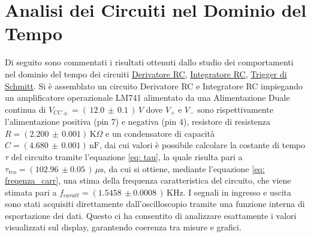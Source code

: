\documentclass[a4paper,12pt]{article}
\begin{document}
\section{Analisi dei Circuiti nel Dominio del Tempo}
\label{componenti}
Di seguito sono commentati i risultati ottenuti dallo studio dei comportamenti nel dominio del tempo dei circuiti \hyperref[sec:rc]{Derivatore RC}, \hyperref[sec:cr]{Integratore RC}, \hyperref[sec:rl]{Trigger di Schmitt}.
Si è assemblato un circuito Derivatore RC e Integratore RC impiegando un amplificatore operazionale LM741 alimentato da una Alimentazione Duale continua di \(V_{CC\pm} = (\,12.0\,\pm\,0.1\, )\, V\) dove \(V_{+}\) e \(V_{-}\) sono rispettivamente l'alimentazione positiva (pin \(7\)) e negativa (pin \(4\)), resistore di resistenza $R = (2.200\,\pm\,0.001) \,\mathrm{K}\Omega$ e un condensatore di capacità $C = (4.680\,\pm\,0.001) \,\mathrm{nF}$, dai cui valori è possibile calcolare la costante di tempo $\tau$ del circuito tramite l'equazione \ref{eq: tau}, la quale risulta pari a $\tau_{teo} = (102.96\,\pm 0.05\,) \,\mu\mathrm{s}$, da cui si ottiene, mediante l'equazione \ref{eq: freqenza_carr}, una stima della frequenza caratteristica del circuito, che viene stimata pari a $f_{caratt} = (1.5458\,\pm0.0008\,) \,\mathrm{KHz}$.
I segnali in ingresso e uscita sono stati acquisiti direttamente dall’oscilloscopio tramite una funzione interna di esportazione dei dati. Questo ci ha consentito di analizzare esattamente i valori visualizzati sul display, garantendo coerenza tra misure e grafici.
\end{document}
